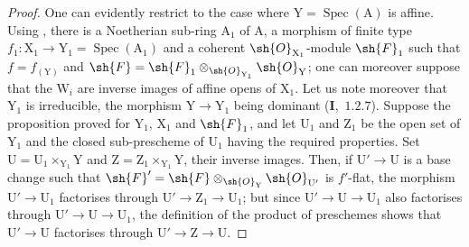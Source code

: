 \begin{proof}
One can evidently restrict to the case where $\mathrm{Y}=\operatorname{Spec}(\mathrm{A})$ is affine. Using
, there is a Noetherian sub-ring $\mathrm{A}_1$ of $\mathrm{A}$, a morphism of finite type
$f_1:\mathrm{X}_1\to\mathrm{Y}_1=\operatorname{Spec}(\mathrm{A}_1)$ and a coherent $\sh{O}_{\mathrm{X}_1}$-module $\sh{F}_1$ such that $f=f_{(\mathrm{Y})}$ and $\sh{F}=\sh{F}_1\otimes_{\sh{O}_{\mathrm{Y}_1}}\sh{O}_\mathrm{Y}$;
one can moreover suppose that the $\mathrm{W}_i$ are inverse images of affine opens of $\mathrm{X}_1$.
Let us note moreover that $\mathrm{Y}_1$ is irreducible, the morphism $\mathrm{Y}\to\mathrm{Y}_1$ being dominant (\textbf{I},~$1.2.7$).
Suppose the proposition proved for $\mathrm{Y}_1$, $\mathrm{X}_1$ and $\sh{F}_1$, and let $\mathrm{U}_1$ and $\mathrm{Z}_1$ be the open set of $\mathrm{Y}_1$
and the closed sub-prescheme of $\mathrm{U}_1$ having the required properties. Set $\mathrm{U}=\mathrm{U}_1\times_{\mathrm{Y}_1}\mathrm{Y}$ and $\mathrm{Z}=\mathrm{Z}_1\times_{\mathrm{Y}_1}\mathrm{Y}$, their inverse images. Then, if $\mathrm{U}'\to\mathrm{U}$ is a base change
such that $\sh{F}'=\sh{F}\otimes_{\sh{O}_\mathrm{Y}}\sh{O}_{\mathrm{U}'}$ is $f'$-flat, the morphism $\mathrm{U}'\to\mathrm{U}_1$ factorises
through $\mathrm{U}'\to\mathrm{Z}_1\to\mathrm{U}_1$; but since $\mathrm{U}'\to\mathrm{U}\to\mathrm{U}_1$ also factorises through $\mathrm{U}'\to\mathrm{U}\to\mathrm{U}_1$, the definition
of the product of preschemes shows that $\mathrm{U}'\to\mathrm{U}$ factorises through $\mathrm{U}'\to\mathrm{Z}\to\mathrm{U}$.


\end{proof}
